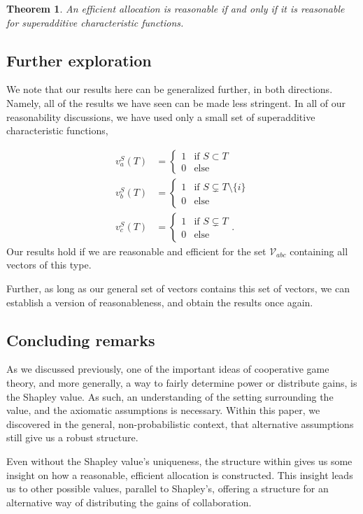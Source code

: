 \documentclass[12pt,letterpaper,final]{article}
\theoremstyle{plain}
\newtheorem{theorem}{Theorem}[section]
\theoremstyle{plain}
\theoremstyle{plain}
\theoremstyle{plain}
\theoremstyle{plain}
\theoremstyle{plain}
\theoremstyle{plain}
\theoremstyle{definition}
\theoremstyle{definition}
\theoremstyle{definition}
\theoremstyle{definition}
\theoremstyle{definition}
\theoremstyle{remark}
\theoremstyle{remark}
\theoremstyle{remark}
\theoremstyle{remark}
\begin{document}
\begin{theorem}\label{thm:reas-superreas}
  An efficient allocation is reasonable if and only if it is
  reasonable for superadditive characteristic functions.
\end{theorem}

\subsection{Further exploration}

We note that our results here can be generalized further, in both
directions. Namely, all of the results we have seen can be made less
stringent. In all of our reasonability discussions, we have used only a
small set of superadditive characteristic functions, 

\begin{align*}
  v^S_a(T) &=
             \begin{cases}
               1 & \text{if } S \subset T\\
               0 & \text{else}
             \end{cases}\\
  v^S_b(T) &=
             \begin{cases}
               1 & \text{if } S \subsetneq T\setminus\{i\}\\
               0 & \text{else}
             \end{cases}\\
  v^S_c(T) &=
             \begin{cases}
               1 & \text{if } S \subsetneq T\\
               0 & \text{else}
             \end{cases}.
\end{align*}
Our results hold if we are reasonable and efficient for the set \(\mathcal{V}_{abc}\) 
containing all vectors of this type.

Further, as long as our general set of vectors contains this set of
vectors, we can establish a version of reasonableness, and obtain the
results once again.

\subsection{Concluding remarks}

As we discussed previously, one of the important ideas of cooperative
game theory, and more generally, a way to fairly determine power or
distribute gains, is the Shapley value. As such, an understanding of
the setting surrounding the value, and the axiomatic assumptions is
necessary. Within this paper, we discovered in the general,
non-probabilistic context, that alternative assumptions still give us
a robust structure.

Even without the Shapley value's uniqueness, the structure within
gives us some insight on 
how a reasonable, efficient allocation is constructed. This insight
leads us to other possible values, parallel to Shapley's, offering a
structure for an alternative way of distributing the gains of
collaboration.



\end{document}
